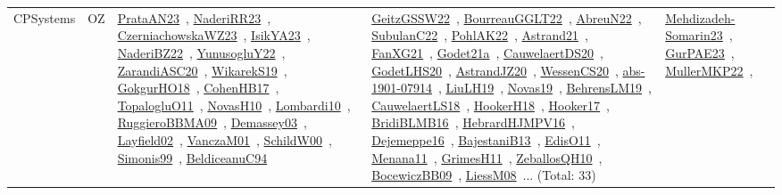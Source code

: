 {\begin{longtable}{lp{3cm}>{\raggedright\arraybackslash}p{6cm}>{\raggedright\arraybackslash}p{6cm}>{\raggedright\arraybackslash}p{8cm}}
CPSystems & OZ & \href{works/PrataAN23.pdf}{PrataAN23}~\cite{PrataAN23}, \href{works/NaderiRR23.pdf}{NaderiRR23}~\cite{NaderiRR23}, \href{works/CzerniachowskaWZ23.pdf}{CzerniachowskaWZ23}~\cite{CzerniachowskaWZ23}, \href{works/IsikYA23.pdf}{IsikYA23}~\cite{IsikYA23}, \href{works/NaderiBZ22.pdf}{NaderiBZ22}~\cite{NaderiBZ22}, \href{works/YunusogluY22.pdf}{YunusogluY22}~\cite{YunusogluY22}, \href{works/ZarandiASC20.pdf}{ZarandiASC20}~\cite{ZarandiASC20}, \href{works/WikarekS19.pdf}{WikarekS19}~\cite{WikarekS19}, \href{works/GokgurHO18.pdf}{GokgurHO18}~\cite{GokgurHO18}, \href{works/CohenHB17.pdf}{CohenHB17}~\cite{CohenHB17}, \href{works/TopalogluO11.pdf}{TopalogluO11}~\cite{TopalogluO11}, \href{works/NovasH10.pdf}{NovasH10}~\cite{NovasH10}, \href{works/Lombardi10.pdf}{Lombardi10}~\cite{Lombardi10}, \href{works/RuggieroBBMA09.pdf}{RuggieroBBMA09}~\cite{RuggieroBBMA09}, \href{works/Demassey03.pdf}{Demassey03}~\cite{Demassey03}, \href{works/Layfield02.pdf}{Layfield02}~\cite{Layfield02}, \href{works/VanczaM01.pdf}{VanczaM01}~\cite{VanczaM01}, \href{works/SchildW00.pdf}{SchildW00}~\cite{SchildW00}, \href{works/Simonis99.pdf}{Simonis99}~\cite{Simonis99}, \href{works/BeldiceanuC94.pdf}{BeldiceanuC94}~\cite{BeldiceanuC94} & \href{works/GeitzGSSW22.pdf}{GeitzGSSW22}~\cite{GeitzGSSW22}, \href{works/BourreauGGLT22.pdf}{BourreauGGLT22}~\cite{BourreauGGLT22}, \href{works/AbreuN22.pdf}{AbreuN22}~\cite{AbreuN22}, \href{works/SubulanC22.pdf}{SubulanC22}~\cite{SubulanC22}, \href{works/PohlAK22.pdf}{PohlAK22}~\cite{PohlAK22}, \href{works/Astrand21.pdf}{Astrand21}~\cite{Astrand21}, \href{works/FanXG21.pdf}{FanXG21}~\cite{FanXG21}, \href{works/Godet21a.pdf}{Godet21a}~\cite{Godet21a}, \href{works/CauwelaertDS20.pdf}{CauwelaertDS20}~\cite{CauwelaertDS20}, \href{works/GodetLHS20.pdf}{GodetLHS20}~\cite{GodetLHS20}, \href{works/AstrandJZ20.pdf}{AstrandJZ20}~\cite{AstrandJZ20}, \href{works/WessenCS20.pdf}{WessenCS20}~\cite{WessenCS20}, \href{works/abs-1901-07914.pdf}{abs-1901-07914}~\cite{abs-1901-07914}, \href{works/LiuLH19.pdf}{LiuLH19}~\cite{LiuLH19}, \href{works/Novas19.pdf}{Novas19}~\cite{Novas19}, \href{works/BehrensLM19.pdf}{BehrensLM19}~\cite{BehrensLM19}, \href{works/CauwelaertLS18.pdf}{CauwelaertLS18}~\cite{CauwelaertLS18}, \href{works/HookerH18.pdf}{HookerH18}~\cite{HookerH18}, \href{works/Hooker17.pdf}{Hooker17}~\cite{Hooker17}, \href{works/BridiBLMB16.pdf}{BridiBLMB16}~\cite{BridiBLMB16}, \href{works/HebrardHJMPV16.pdf}{HebrardHJMPV16}~\cite{HebrardHJMPV16}, \href{works/Dejemeppe16.pdf}{Dejemeppe16}~\cite{Dejemeppe16}, \href{works/BajestaniB13.pdf}{BajestaniB13}~\cite{BajestaniB13}, \href{works/EdisO11.pdf}{EdisO11}~\cite{EdisO11}, \href{works/Menana11.pdf}{Menana11}~\cite{Menana11}, \href{works/GrimesH11.pdf}{GrimesH11}~\cite{GrimesH11}, \href{works/ZeballosQH10.pdf}{ZeballosQH10}~\cite{ZeballosQH10}, \href{works/BocewiczBB09.pdf}{BocewiczBB09}~\cite{BocewiczBB09}, \href{works/LiessM08.pdf}{LiessM08}~\cite{LiessM08}... (Total: 33) & \href{works/Mehdizadeh-Somarin23.pdf}{Mehdizadeh-Somarin23}~\cite{Mehdizadeh-Somarin23}, \href{works/GurPAE23.pdf}{GurPAE23}~\cite{GurPAE23}, \href{works/MullerMKP22.pdf}{MullerMKP22}~\cite{MullerMKP22}, 
\end{longtable}}
